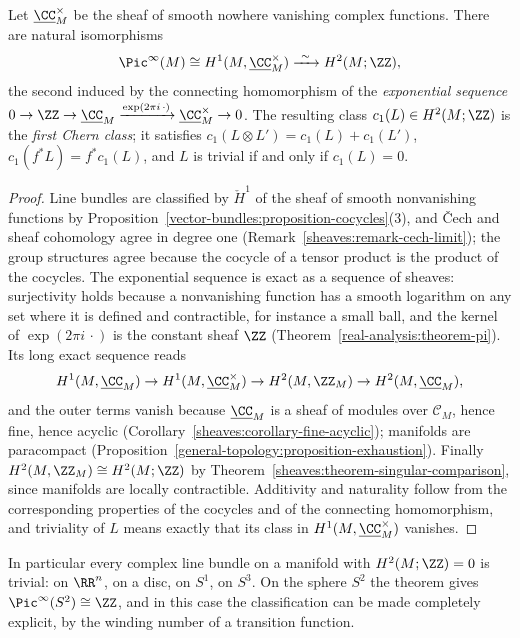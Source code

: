 \begin{theorem}\label{vector-bundles:theorem-line-bundles}
Let $\underline{\CC}^\times_M$ be the sheaf of smooth nowhere vanishing complex functions. There are natural isomorphisms
\[
\Pic^\infty(M) \cong H^1(M, \underline{\CC}^\times_M) \xrightarrow{\ \sim\ } H^2(M; \ZZ),
\]
the second induced by the connecting homomorphism of the \emph{exponential sequence}
$0 \to \ZZ \to \underline{\CC}_M \xrightarrow{\exp(2\pi i\,\cdot)} \underline{\CC}^\times_M \to 0$. The resulting class $c_1(L) \in H^2(M; \ZZ)$ is the \emph{first Chern class}; it satisfies
$c_1(L \otimes L') = c_1(L) + c_1(L')$, $c_1(f^*L) = f^*c_1(L)$, and $L$ is trivial if and only if $c_1(L) = 0$.
\end{theorem}

\begin{proof}
Line bundles are classified by $\check{H}^1$ of the sheaf of smooth nonvanishing functions by Proposition~\ref{vector-bundles:proposition-cocycles}(3), and \v{C}ech and sheaf cohomology agree in degree one
(Remark~\ref{sheaves:remark-cech-limit}); the group structures agree because the cocycle of a tensor product is the product of the cocycles. The exponential sequence is exact as a sequence of
sheaves: surjectivity holds because a nonvanishing function has a smooth logarithm on any set where it is defined and contractible, for instance a small ball, and the kernel of $\exp(2\pi i\,\cdot)$ is the
constant sheaf $\ZZ$ (Theorem~\ref{real-analysis:theorem-pi}). Its long exact sequence reads
\[
H^1(M, \underline{\CC}_M) \to H^1(M, \underline{\CC}^\times_M) \to H^2(M, \ZZ_M) \to H^2(M, \underline{\CC}_M),
\]
and the outer terms vanish because $\underline{\CC}_M$ is a sheaf of modules over $\mathcal{C}_M$, hence fine, hence acyclic (Corollary~\ref{sheaves:corollary-fine-acyclic}); manifolds are
paracompact (Proposition~\ref{general-topology:proposition-exhaustion}). Finally $H^2(M, \ZZ_M) \cong H^2(M; \ZZ)$ by Theorem~\ref{sheaves:theorem-singular-comparison}, since manifolds are locally
contractible. Additivity and naturality follow from the corresponding properties of the cocycles and of the connecting homomorphism, and triviality of $L$ means exactly that its class in
$H^1(M, \underline{\CC}^\times_M)$ vanishes.
\end{proof}

In particular every complex line bundle on a manifold with $H^2(M; \ZZ) = 0$ is trivial: on $\RR^n$, on a disc, on $S^1$, on $S^3$. On the sphere $S^2$ the theorem gives
$\Pic^\infty(S^2) \cong \ZZ$, and in this case the classification can be made completely explicit, by the winding number of a transition function.

